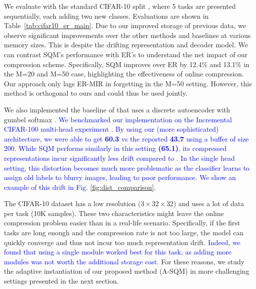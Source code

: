 \documentclass[colorinlistoftodos]{article} %
\newcommand\mynotesLC[1]{\textcolor{blue}{#1}}
\begin{document}
We evaluate with the standard CIFAR-10 split \citep{aljundi2018Online}, where 5 tasks are presented sequentially, each adding two new classes. Evaluations are shown in Table~\ref{tab:cifar10_er_main}. 
Due to our improved storage of previous data, we observe significant improvements over the other methods and baselines at various memory sizes. This is despite the drifting representation and decoder model. We can contrast SQM's performance with ER's to understand the net impact of our compression scheme. Specifically, SQM improves over ER by 12.4\% and 13.1\% in the M=20 and M=50 case, highlighting the effectiveness of online compression. Our approach only lags ER-MIR in forgetting in the M=50 setting. However, this method is orthogonal to ours and could thus be used jointly.

We also implemented the baseline of \cite{riemer2018learning} that uses a discrete autoencoder with gumbel softmax \citep{jang2016categorical}. \mynotesLC{We benchmarked our implementation on the Incremental CIFAR-100 multi-head experiment \cite{lopez2017gradient}. By using our (more sophisticated) architecture, we were able to get \textbf{60.3} vs the reported \textbf{43.7} using a buffer of size 200. While SQM performs similarly in this setting \textbf{(65.1)}, its compressed representations incur significantly less drift compared to \cite{riemer2018learning}. In the single head setting, this distortion becomes much more problematic as the classifier learns to assign old labels to blurry images, leading to poor performance. We show an example of this drift in Fig. \ref{fig:dist_comparison}.}



The CIFAR-10 dataset has a low resolution ($3 \times 32 \times 32$) and uses a lot of data per task (10K samples). These two characteristics might leave the online compression problem easier than in a real-life scenario. Specifically, if the first tasks are long enough and the compression rate is not too large, the model can quickly converge and thus not incur too much representation drift. \mynotesLC{Indeed, we found that using a single module worked best for this task, as adding more modules was not worth the additional storage cost}. For these reasons, we study the adaptive instantiation of our proposed method (A-SQM) in more challenging settings presented in the next section. 
\end{document}

